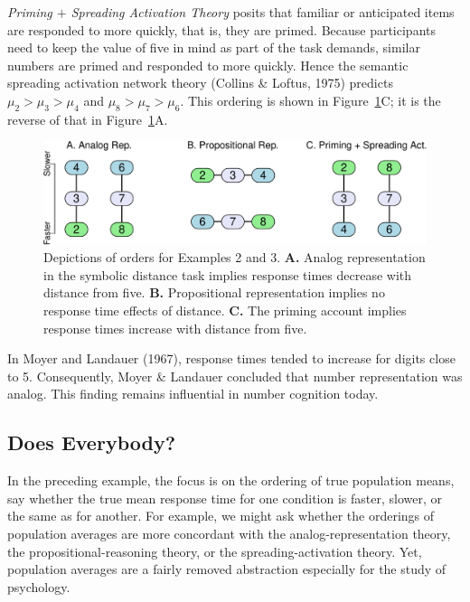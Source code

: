 \documentclass[english,,man]{apa6}
\begin{document}
\emph{Priming \(+\) Spreading Activation Theory} posits that familiar or anticipated items are responded to more quickly, that is, they are primed. Because participants need to keep the value of five in mind as part of the task demands, similar numbers are primed and responded to more quickly. Hence the semantic spreading activation network theory (Collins \& Loftus, 1975) predicts \(\mu_2>\mu_3>\mu_4\) and \(\mu_8>\mu_7>\mu_6\). This ordering is shown in Figure~\ref{fig:order}C; it is the reverse of that in Figure~\ref{fig:order}A.

\begin{figure}
\centering
\includegraphics{p_files/figure-latex/order-1.pdf}
\caption{\label{fig:order}Depictions of orders for Examples 2 and 3. \textbf{A.} Analog representation in the symbolic distance task implies response times decrease with distance from five. \textbf{B.} Propositional representation implies no response time effects of distance. \textbf{C.} The priming account implies response times increase with distance from five.}
\end{figure}

In Moyer and Landauer (1967), response times tended to increase for digits close to 5. Consequently, Moyer \& Landauer concluded that number representation was analog. This finding remains influential in number cognition today.

\hypertarget{does-everybody}{%
\subsection{Does Everybody?}\label{does-everybody}}

In the preceding example, the focus is on the ordering of true population means, say whether the true mean response time for one condition is faster, slower, or the same as for another. For example, we might ask whether the orderings of population averages are more concordant with the analog-representation theory, the propositional-reasoning theory, or the spreading-activation theory. Yet, population averages are a fairly removed abstraction especially for the study of psychology.
\end{document}
